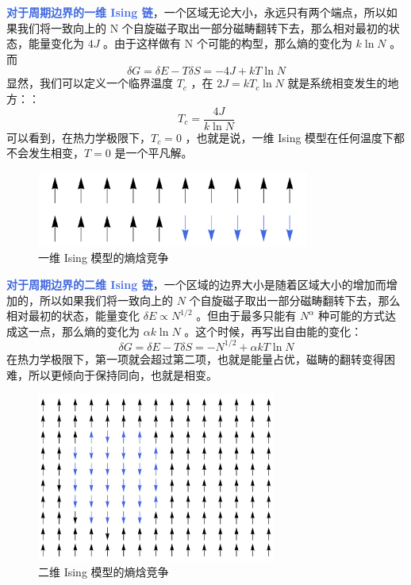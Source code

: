 \textcolor{RoyalBlue}{\textbf{\kaishu 对于周期边界的一维 Ising 链}}，一个区域无论大小，永远只有两个端点，所以如果我们将一致向上的 N 个自旋磁子取出一部分磁畴翻转下去，那么相对最初的状态，能量变化为 $4J$ 。由于这样做有 N 个可能的构型，那么熵的变化为 $k\ln N$ 。而 
\[
    \delta G = \delta E - T\delta S = -4J + kT\ln N
\]
显然，我们可以定义一个临界温度 $T_c$ ，在 $2J = kT_c \ln N$ 就是系统相变发生的地方：：
\begin{equation}\label{equ:一维Ising模型的临界温度}
    T_c = \frac{4J}{k\ln N}
\end{equation}
可以看到，在热力学极限下，$T_c = 0$ ，也就是说，一维 Ising 模型在任何温度下都不会发生相变，$T = 0$ 是一个平凡解。

\begin{figure}[ht]
    \centering
    \includegraphics[width=0.8\textwidth]{figures/one-dim-entropy.png}
    \caption{\kaishu 一维 Ising 模型的熵焓竞争}
    \label{fig:一维 Ising 模型的熵焓竞争}
\end{figure}

\textcolor{RoyalBlue}{\textbf{\kaishu 对于周期边界的二维 Ising 链}}，一个区域的边界大小是随着区域大小的增加而增加的，所以如果我们将一致向上的 $N$ 个自旋磁子取出一部分磁畴翻转下去，那么相对最初的状态，能量变化 $\delta E \propto N^{1/2}$ 。但由于最多只能有 $N^\alpha$ 种可能的方式达成这一点，那么熵的变化为 $\alpha k\ln N$ 。这个时候，再写出自由能的变化：
\[
    \delta G = \delta E - T\delta S = -N^{1/2} + \alpha kT\ln N
\]
在热力学极限下，第一项就会超过第二项，也就是能量占优，磁畴的翻转变得困难，所以更倾向于保持同向，也就是相变。


\begin{figure}[ht]
    \centering
    \includegraphics[width=0.7\textwidth]{figures/two-dim-entropy.png}
    \caption{\kaishu 二维 Ising 模型的熵焓竞争}
    \label{fig:二维 Ising 模型的熵焓竞争}
\end{figure}

